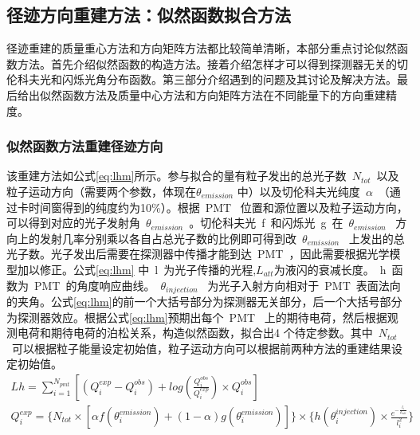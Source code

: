 \subsection{径迹方向重建方法：似然函数拟合方法}
径迹重建的质量重心方法和方向矩阵方法都比较简单清晰，本部分重点讨论似然函数方法。首先介绍似然函数的构造方法。接着介绍怎样才可以得到探测器无关的切伦科夫光和闪烁光角分布函数。第三部分介绍遇到的问题及其讨论及解决方法。最后给出似然函数方法及质量中心方法和方向矩阵方法在不同能量下的方向重建精度。
\subsubsection{似然函数方法重建径迹方向}
该重建方法如公式\ref{eq:lhm}所示。参与拟合的量有粒子发出的总光子数~$N_{tot}$~以及粒子运动方向（需要两个参数，体现在$\theta_{emission}$ 中）以及切伦科夫光纯度~$\alpha$~（通过卡时间窗得到的纯度约为10\%）。根据~PMT~ 位置和源位置以及粒子运动方向，可以得到对应的光子发射角~$\theta_{emission}$~。切伦科夫光~f~和闪烁光~g~在~$\theta_{emission}$~ 方向上的发射几率分别乘以各自占总光子数的比例即可得到改~$\theta_{emission}$~ 上发出的总光子数。光子发出后需要在探测器中传播才能到达~PMT~，因此需要根据光学模型加以修正。公式\ref{eq:lhm} 中~l~为光子传播的光程,$L_{att}$为液闪的衰减长度。~h~函数为~PMT~的角度响应曲线。~$\theta_{injection}$~ 为光子入射方向相对于~PMT~表面法向的夹角。公式\ref{eq:lhm}的前一个大括号部分为探测器无关部分，后一个大括号部分为探测器效应。根据公式\ref{eq:lhm}预期出每个~PMT~ 上的期待电荷，然后根据观测电荷和期待电荷的泊松关系，构造似然函数，拟合出4 个待定参数。其中~$N_{tot}$~可以根据粒子能量设定初始值，粒子运动方向可以根据前两种方法的重建结果设定初始值。
\begin{eqnarray}\label{eq:lhm}
Lh = \sum_{i=1}^{N_{pmt}} \left [  ( Q^{exp}_i -Q^{obs}_i )+log(\frac{Q^{obs}_i}{Q^{exp}_i}) \times Q^{obs}_i \right ] \quad\quad\quad\quad\quad\quad \\
Q^{exp}_i  =
 \bigg \{ N_{tot} \times \left [ \alpha f(\theta^{emission}_i)+(1-\alpha)g(\theta^{emission}_i) \right ] \bigg \}
\times \bigg \{ h(\theta_i^{injection}) \times \frac{e^{-\frac{l_i}{L_{att}}}}{l^2_i} \bigg \} \nonumber
\end{eqnarray}
